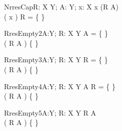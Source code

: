 \begin{theorem}{NrresCap}{R: X \rel Y; A: \power Y; x: X}
x \in \dom (R \nrres A) \\
\se( x ) \cap \dom R = \{ \}
\end{theorem}

\begin{theorem}{RresEmpty2}{A:\power Y; R: X \rel Y}
A = \{ \} \\
\dom ( R \rres A ) \neq \{ \}
\end{theorem}

\begin{theorem}{RresEmpty3}{A:\power Y; R: X \rel Y}
R = \{ \} \\
\dom ( R \rres A ) \neq \{ \}
\end{theorem}

\begin{theorem}{RresEmpty4}{A:\power Y; R: X \rel Y}
A \cap \ran R = \{ \} \\
\dom ( R \rres A ) \neq \{ \}
\end{theorem}

\begin{theorem}{RresEmpty5}{A:\power Y; R: X \rel Y}
\ran R \subset A \\
\dom ( R \rres A ) \neq \{ \}
\end{theorem}
